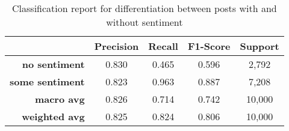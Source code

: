 \begin{table}[!ht]
	\centering
	\begin{tabular}{rcccc}
	\toprule
 & \textbf{Precision} & \textbf{Recall} & \textbf{F1-Score} & \textbf{Support}\\
 \midrule
\textbf{no sentiment} & 0.830 & 0.465 & 0.596 & 2,792\\
\textbf{some sentiment} & 0.823 & 0.963 & 0.887 & 7,208\\
\midrule
\textbf{macro avg} & 0.826 & 0.714 & 0.742 & 10,000\\
\textbf{weighted avg} & 0.825 & 0.824 & 0.806 & 10,000\\
		\bottomrule
	\end{tabular}
	\caption{Classification report for differentiation between posts with and without sentiment}
	\label{table-classification-report-two-class}
\end{table}